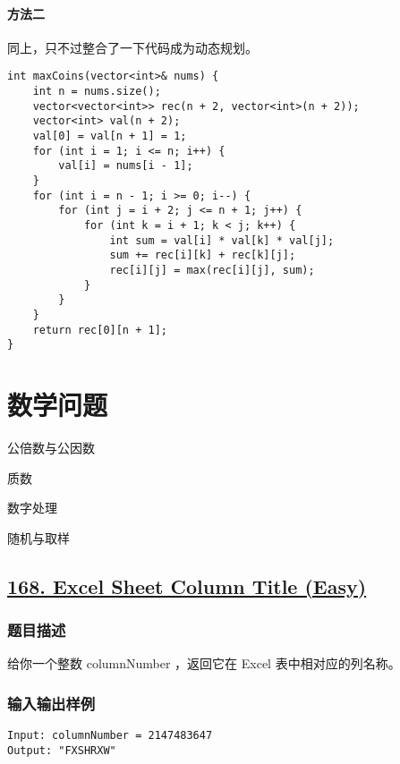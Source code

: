 \documentclass[lang=cn,10pt]{elegantbook}
\begin{document}
\subsubsection*{方法二}

同上，只不过整合了一下代码成为动态规划。

\begin{lstlisting}
int maxCoins(vector<int>& nums) {
	int n = nums.size();
	vector<vector<int>> rec(n + 2, vector<int>(n + 2));
	vector<int> val(n + 2);
	val[0] = val[n + 1] = 1;
	for (int i = 1; i <= n; i++) {
		val[i] = nums[i - 1];
	}
	for (int i = n - 1; i >= 0; i--) {
		for (int j = i + 2; j <= n + 1; j++) {
			for (int k = i + 1; k < j; k++) {
				int sum = val[i] * val[k] * val[j];
				sum += rec[i][k] + rec[k][j];
				rec[i][j] = max(rec[i][j], sum);
			}
		}
	}
	return rec[0][n + 1];
}
\end{lstlisting}

\chapter{数学问题}

\begin{introduction}[前情提要]
	\item 公倍数与公因数
	\item 质数
	\item 数字处理
	\item 随机与取样
\end{introduction}

{\color{red}\section{\href{https://leetcode.cn/problems/excel-sheet-column-title/}{168. Excel Sheet Column Title (Easy)}}} \label{ch9.168}

\subsection*{题目描述}

给你一个整数 columnNumber ，返回它在 Excel 表中相对应的列名称。

\subsection*{输入输出样例}

\begin{lstlisting}
Input: columnNumber = 2147483647
Output: "FXSHRXW"
\end{lstlisting}
\end{document}
